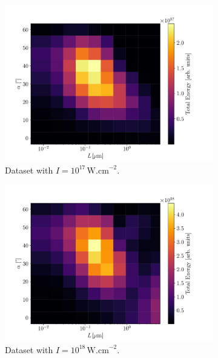 \begin{figure}[ht]
	\centering
	\begin{subfigure}{0.49\textwidth}
		\centering
		\includegraphics[width=\textwidth]{figures/I_1e17_cut_10}
		\caption{Dataset with $I = 10^{17} \, \mathrm{W.cm}^{-2}$.}
		\label{fig:dataset2-a}
	\end{subfigure}
	\hfill
	\begin{subfigure}{0.49\textwidth}
		\centering
		\includegraphics[width=\textwidth]{figures/I_1e18_cut_10}
		\caption{Dataset with $I =10^{18} \, \mathrm{W.cm}^{-2}$.}
		\label{fig:datset2-b}
	\end{subfigure}
	\begin{subfigure}{0.49\textwidth}

\end{subfigure}
\end{figure}
